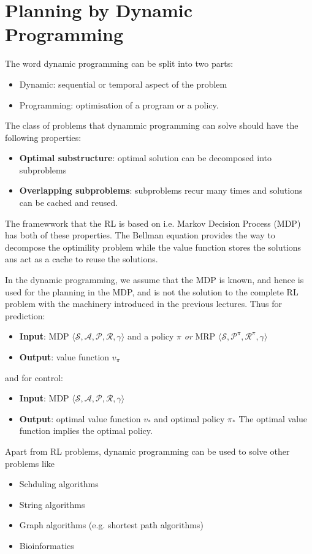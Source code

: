 \section{Planning by Dynamic Programming}
The word dynamic programming can be split into two parts:
\begin{itemize} 
    \item Dynamic: sequential or temporal aspect of the problem
    \item Programming: optimisation of a program or a policy.
    \end{itemize}

The class of problems that dynammic programming can solve should have the following properties:
\begin{itemize}
    \item \textbf{Optimal substructure}: optimal solution can be decomposed into subproblems
    \item \textbf{Overlapping subproblems}: subproblems recur many times and 
    solutions can be cached and reused.
\end{itemize}
The framewwork that the RL is based on i.e. Markov Decision Process (MDP) has both 
of these properties. The Bellman equation provides the way to decompose the optimility problem
while the value function stores the solutions ans act as a cache to reuse the solutions.

In the dynamic programming, we assume that the MDP is known, and hence is used for the planning
in the MDP, and is not the solution to the complete RL problem with the machinery introduced
in the previous lectures.
Thus for prediction:
\begin{itemize}
    \item \textbf{Input}: MDP \(
        \langle \mathcal{S}, \mathcal{A}, \mathcal{P}, \mathcal{R}, \gamma \rangle
        \) and a policy \(\pi\) \emph{or} MRP \(
        \langle \mathcal{S}, \mathcal{P}^{\pi}, \mathcal{R}^{\pi}, \gamma \rangle
        \)
    \item \textbf{Output}: value function \(v_{\pi}\)
\end{itemize}
and for control:
\begin{itemize}
    \item \textbf{Input}: MDP \(
        \langle \mathcal{S}, \mathcal{A}, \mathcal{P}, \mathcal{R}, \gamma \rangle
        \)
    \item \textbf{Output}: optimal value function \(v_{*}\) and optimal policy \(\pi_{*}\)
    The optimal value function implies the optimal policy.
\end{itemize}
Apart from RL problems, dynamic programming can be used to solve other problems like
\begin{itemize}
    \item Schduling algorithms
    \item String algorithms
    \item Graph algorithms (e.g. shortest path algorithms)
    \item Bioinformatics
\end{itemize}

